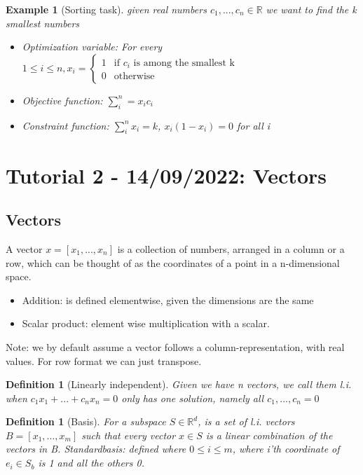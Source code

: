 \documentclass[11pt]{article}
\newtheorem{definition}[theorem]{Definition}
\newtheorem{example}[theorem]{Example}
\begin{document}
\begin{example}[Sorting task] given real numbers $c_1, ..., c_n \in \mathbb{R}$ we want to find the k smallest numbers
\begin{itemize}
    \item Optimization variable: For every $1 \leq i \leq n, x_i = \begin{cases}
        1 & \text{if $c_i$ is among the smallest k} \\
        0 & \text{otherwise}
    \end{cases}$ 
    \item Objective function: $\sum_i^n = x_i c_i$
    \item Constraint function: $\sum_i^n x_i = k$, $x_i(1-x_i) = 0$ for all i  
    
\end{itemize} 
    
\end{example}

\section{Tutorial 2 -  14/09/2022: Vectors}
\subsection*{Vectors}
A vector $ x= [x_1, ..., x_n]$ is a collection of numbers, arranged in a column or a row, which can be thought of as the coordinates of a point in a n-dimensional space. 
\begin{itemize}
    \item Addition: is defined elementwise, given the dimensions are the same
    \item Scalar product: element wise multiplication with a scalar.
\end{itemize}

Note: we by default assume a vector follows a column-representation, with real values. For row format we can just transpose. 

\begin{definition}[Linearly independent]
    Given we have n vectors, we call them l.i. when $c_1 x_1 + ... + c_n x_n = 0$ only has one solution, namely all $c_1, ..., c_n = 0$
\end{definition}

\begin{definition}[Basis]
    For a subspace $S \in \mathbb{R}^d$, is a set of l.i. vectors $B = [x_1, ..., x_m]$ such that every vector $x \in S$ is a linear combination of the vectors in B.   \newline
    Standardbasis: defined where $0 \leq i \leq m$, where i'th coordinate of $e_i \in S_b$ is 1 and all the others 0.  
\end{definition}
\end{document}
